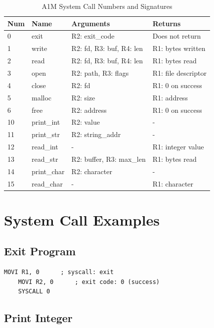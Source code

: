 \documentclass[12pt,a4paper,oneside]{book}
\begin{document}
\begin{table}[H]
\centering
\caption{A1M System Call Numbers and Signatures}
\label{tab:syscall-reference}
\small
\begin{tabularx}{\textwidth}{|l|l|X|X|}
\hline
\textbf{Num} & \textbf{Name} & \textbf{Arguments} & \textbf{Returns} \\
\hline
0 & exit & R2: exit\_code & Does not return \\
\hline
1 & write & R2: fd, R3: buf, R4: len & R1: bytes written \\
\hline
2 & read & R2: fd, R3: buf, R4: len & R1: bytes read \\
\hline
3 & open & R2: path, R3: flags & R1: file descriptor \\
\hline
4 & close & R2: fd & R1: 0 on success \\
\hline
5 & malloc & R2: size & R1: address \\
\hline
6 & free & R2: address & R1: 0 on success \\
\hline
10 & print\_int & R2: value & - \\
\hline
11 & print\_str & R2: string\_addr & - \\
\hline
12 & read\_int & - & R1: integer value \\
\hline
13 & read\_str & R2: buffer, R3: max\_len & R1: bytes read \\
\hline
14 & print\_char & R2: character & - \\
\hline
15 & read\_char & - & R1: character \\
\hline
\end{tabularx}
\end{table}

\section{System Call Examples}

\subsection{Exit Program}

\begin{lstlisting}[style=assembly]
    MOVI R1, 0      ; syscall: exit
    MOVI R2, 0      ; exit code: 0 (success)
    SYSCALL 0
\end{lstlisting}

\subsection{Print Integer}
\end{document}
